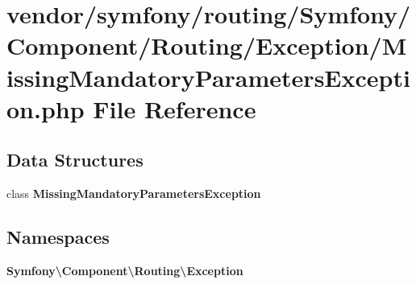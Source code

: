 \section{vendor/symfony/routing/\+Symfony/\+Component/\+Routing/\+Exception/\+Missing\+Mandatory\+Parameters\+Exception.php File Reference}
\label{_missing_mandatory_parameters_exception_8php}
\subsection*{Data Structures}
\begin{DoxyCompactItemize}
\item 
class {\bf Missing\+Mandatory\+Parameters\+Exception}
\end{DoxyCompactItemize}
\subsection*{Namespaces}
\begin{DoxyCompactItemize}
\item 
 {\bf Symfony\textbackslash{}\+Component\textbackslash{}\+Routing\textbackslash{}\+Exception}
\end{DoxyCompactItemize}
